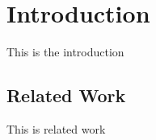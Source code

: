

\section{Introduction}\label{sec:introduction}
This is the introduction

\subsection*{Related Work}\label{subsec:related-work}
This is related work
